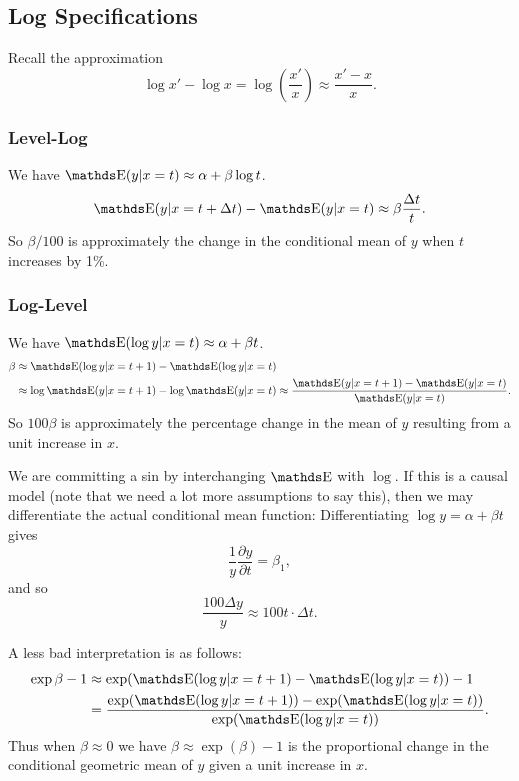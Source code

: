 \documentclass[letterpaper, 10pt]{article}
\begin{document}
\subsection{Log Specifications}
Recall the approximation
\[
  \log x' - \log x
  = \log \left( \frac{x'}{x} \right)
  \approx \frac{x' - x}{x}.
\]

\subsubsection{Level-Log}
We have \(\E(y|x = t) \approx \alpha + \beta \log t\).
\[
  \E(y|x = t + \Delta t) - \E(y|x = t)
  \approx \beta \frac{\Delta t}{t}.
\]
So \(\beta / 100\) is approximately the change in the conditional mean of \(y\) when \(t\) increases by 1\%.

\subsubsection{Log-Level}
We have \(\E(\log y | x = t) \approx \alpha + \beta t\).
\begin{align*}
  \beta
  &\approx \E(\log y | x = t + 1) - \E(\log y | x = t) \\
  &\approx \log \E(y| x = t + 1) - \log \E(y| x = t)
  \approx \frac{\E(y| x = t + 1) - \E(y|x = t)}{\E(y|x = t)}.
\end{align*}
So \(100\beta\) is approximately the percentage change in the mean of \(y\) resulting from a unit increase in \(x\).
\begin{remark}
  We are committing a sin by interchanging \(\E\) with \(\log\).
  If this is a causal model (note that we need a lot more assumptions to say this), then we may differentiate the actual conditional mean function:
  Differentiating \(\log y = \alpha + \beta t\) gives
  \[
    \frac{1}{y} \frac{\partial y}{\partial t}
    = \beta_1,
  \]
  and so
  \[
    \frac{100 \Delta y}{y}
    \approx 100 t \cdot \Delta t.
  \]
\end{remark}

A less bad interpretation is as follows:
\begin{align*}
  \exp \beta - 1
  &\approx \exp(\E(\log y | x = t + 1) - \E(\log y | x = t)) - 1 \\
  &= \frac{\exp(\E(\log y | x = t + 1)) - \exp (\E(\log y | x = t))}{\exp(\E(\log y | x = t))}.
\end{align*}
Thus when \(\beta \approx 0\) we have \(\beta \approx \exp (\beta) - 1\) is the proportional change in the conditional geometric mean of \(y\) given a unit increase in \(x\).
\end{document}
